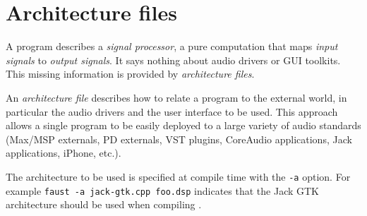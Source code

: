 \chapter{Architecture files} 
\label{audio}

A \faust program describes a \emph{signal processor}, a pure computation that maps \emph{input signals} to \emph{output signals}. It says nothing about audio drivers or GUI toolkits. This missing information is provided by \emph{architecture files}. 



An \emph{architecture file} describes how to relate a \faust program to the external world, in particular the audio drivers and the user interface to be used. This approach allows a single \faust program to be easily deployed to a large variety of audio standards (Max/MSP externals, PD externals, VST plugins, CoreAudio applications, Jack applications, iPhone, etc.). 

The architecture to be used is specified at compile time with the \lstinline'-a' option. For example
\lstinline'faust -a jack-gtk.cpp foo.dsp' indicates that the Jack GTK architecture should be used when compiling .

